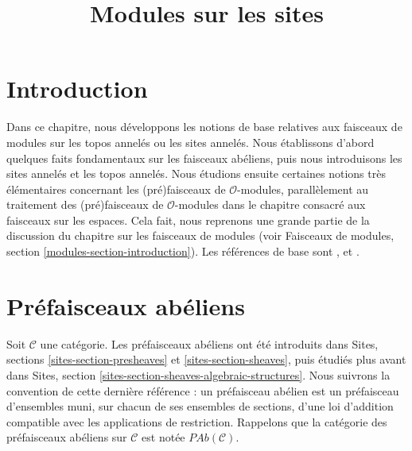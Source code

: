 

%


\title{Modules sur les sites}


\maketitle

\label{section-phantom}

\tableofcontents

\section{Introduction}
\label{section-introduction}

\noindent
Dans ce chapitre, nous développons les notions de base relatives aux faisceaux
de modules sur les topos annelés ou les sites annelés. Nous établissons d'abord
quelques faits fondamentaux sur les faisceaux abéliens, puis nous introduisons
les sites annelés et les topos annelés. Nous étudions ensuite certaines notions
très élémentaires concernant les (pré)faisceaux de $\mathcal{O}$-modules,
parallèlement au traitement des (pré)faisceaux de $\mathcal{O}$-modules dans le
chapitre consacré aux faisceaux sur les espaces. Cela fait, nous reprenons une
grande partie de la discussion du chapitre sur les faisceaux de modules (voir
Faisceaux de modules, section \ref{modules-section-introduction}). Les
références de base sont \cite{FAC}, \cite{EGA} et \cite{SGA4}.






\section{Préfaisceaux abéliens}
\label{section-abelian-pre-sheaves}

\noindent
Soit $\mathcal{C}$ une catégorie. Les préfaisceaux abéliens ont été introduits
dans Sites, sections \ref{sites-section-presheaves} et
\ref{sites-section-sheaves}, puis étudiés plus avant dans Sites, section
\ref{sites-section-sheaves-algebraic-structures}. Nous suivrons la convention
de cette dernière référence : un préfaisceau abélien est un préfaisceau
d'ensembles muni, sur chacun de ses ensembles de sections, d'une loi d'addition
compatible avec les applications de restriction. Rappelons que la catégorie
des préfaisceaux abéliens sur $\mathcal{C}$ est notée
$\textit{PAb}(\mathcal{C})$.

